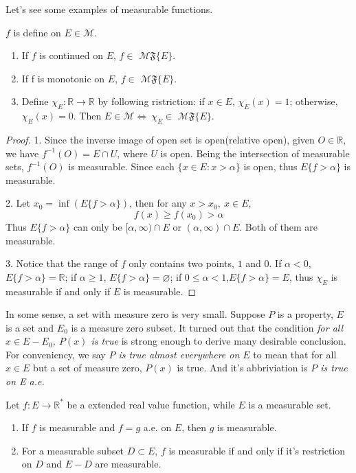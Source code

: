 \documentclass[lang=en, 12pt]{elegantbook}
\newcommand{\RR}{\mathbb{R}}
\newcommand{\lmf}[1]{$\mathcal{M} \mathfrak{F} \{#1\}$}
\begin{document}
            Let's see some examples of measurable functions.
            \begin{proposition}
                $f$ is define on $E \in \mathcal{M}$. 
                \begin{enumerate}
                    \item If $f$ is continued on $E$, $f \in$ \lmf{E}.
                    \item If f is monotonic on $E$, $f \in$ \lmf{E}.
                    \item Define $\chi_E:\mathbb{R} \to \mathbb{R}$ by following ristriction: if $x \in E$, $\chi_E(x)=1$; 
                otherwise, $\chi_E(x)=0$. Then $E \in \mathcal{M} \Longleftrightarrow\ \chi_E \in$ \lmf{E}. 
                \end{enumerate}
            \end{proposition}
            \begin{proof}
                1. Since the inverse image of open set is open(relative open), given $O \in \RR$, we have $f^{-1}(O) = E \cap U$, where $U$ is open.
            Being the intersection of measurable sets, $f^{-1}(O)$ is measurable. Since each $\{x \in E:x > \alpha\}$ is open, thus $E\{f > \alpha\}$
            is measurable.\par
                2. Let $x_0 = \inf( E\{f > \alpha\})$, then for any $x>x_0, \ x \in E$, 
                $$f(x) \geq f(x_0) > \alpha$$
                Thus $E\{f> \alpha \}$ can only be $[\alpha,\infty) \cap E$ or $(\alpha,\infty) \cap E$. Both of them are measurable.\par
                3. Notice that the range of $f$ only contains two points, $1$ and $0$. If $\alpha < 0$, $E\{ f > \alpha \} = \RR$;
                if $\alpha \geq 1$, $E\{ f > \alpha \} = \varnothing$; if $ 0 \leq \alpha < 1$,$E\{ f > \alpha \} = E$, thus 
                $\chi_E$ is measurable if and only if $E$ is measurable.
            \end{proof}
            In some sense, a set with measure zero is very small. Suppose $P$ is a property, $E$ is a set and $E_0$ is a measure zero subset. 
        It turned out that the condition \textsl{for all $x \in E-E_0$, $P(x)$ is true} is strong enough to derive many desirable conclusion.  
        For conveniency, we say \textsl{$P$ is true almost everywhere on $E$} to mean that for all $x \in E$ but a set of measure zero, $P(x)$ 
        is true. And it's abbriviation is \textsl{$P$ is true on E a.e.} 
            \begin{proposition}\label{MZS}
                Let $f:E \to \RR^*$ be a extended real value function, while $E$ is a measurable set. 
                \begin{enumerate}
                    \item If $f$ is measurable and $f = g$ a.e. on $E$, then $g$ is measurable.
                    \item For a measurable subset $D \subset E$, $f$ is measurable if and only if it's restriction on $D$ and $E-D$ are 
                    measurable.
                \end{enumerate}
            \end{proposition}
\end{document}
